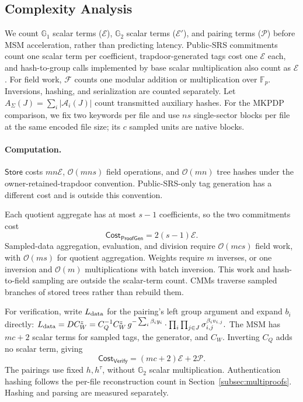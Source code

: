 \documentclass[lettersize,journal]{IEEEtran}
\newcommand{\GG}{\mathbb{G}}
\newcommand{\FF}{\mathbb{F}}
\newcommand{\CompExp}{\mathcal{E}}
\newcommand{\CompPair}{\mathcal{P}}
\newcommand{\CompField}{\mathcal{F}}
\newcommand{\Store}{\ensuremath{\mathsf{Store}}}
\newcommand{\ProofGen}{\ensuremath{\mathsf{ProofGen}}}
\newcommand{\Verify}{\ensuremath{\mathsf{Verify}}}
\begin{document}
\subsection{Complexity Analysis}
\label{sec:complexity_analysis}
We count $\GG_1$ scalar terms ($\CompExp$), $\GG_2$ scalar terms ($\CompExp'$), and pairing terms ($\CompPair$) before MSM acceleration, rather than predicting latency. Public-SRS commitments count one scalar term per coefficient, trapdoor-generated tags cost one $\CompExp$ each, and hash-to-group calls implemented by base scalar multiplication also count as $\CompExp$. For field work, $\CompField$ counts one modular addition or multiplication over $\FF_p$. Inversions, hashing, and serialization are counted separately. Let $A_\Sigma(J)=\sum_i|\mathcal A_i(J)|$ count transmitted auxiliary hashes.
For the MKPDP comparison, we fix two keywords per file and use $ns$ single-sector blocks per file at the same encoded file size; its $c$ sampled units are native blocks.

\paragraph{Computation.}
\Store{} costs $mn\CompExp$, $\mathcal O(mns)$ field operations, and $\mathcal O(mn)$ tree hashes under the owner-retained-trapdoor convention. Public-SRS-only tag generation has a different cost and is outside this convention.

Each quotient aggregate has at most $s-1$ coefficients, so the two commitments cost
$$
\mathsf{Cost}_{\ProofGen}=2(s-1)\CompExp.
$$
Sampled-data aggregation, evaluation, and division require $\mathcal O(mcs)$ field work, with $\mathcal O(ms)$ for quotient aggregation. Weights require $m$ inverses, or one inversion and $\mathcal O(m)$ multiplications with batch inversion. This work and hash-to-field sampling are outside the scalar-term count. CMMs traverse sampled branches of stored trees rather than rebuild them.

For verification, write $L_{\rm data}$ for the pairing's left group argument and expand $b_i$ directly:
$
L_{\rm data}=DC_W^z
=C_Q^{-1}C_W^z\,
g^{-\sum_i\beta_i y_i}\cdot
\prod_i\prod_{j\in J}\sigma_{i,j}^{\beta_i v_{i,j}}.
$
The MSM has $mc+2$ scalar terms for sampled tags, the generator, and $C_W$. Inverting $C_Q$ adds no scalar term, giving
$$
\mathsf{Cost}_{\Verify}=(mc+2)\CompExp+2\CompPair.
$$
The pairings use fixed $h,h^\tau$, without $\GG_2$ scalar multiplication. Authentication hashing follows the per-file reconstruction count in Section~\ref{subsec:multiproofs}. Hashing and parsing are measured separately.
\end{document}
